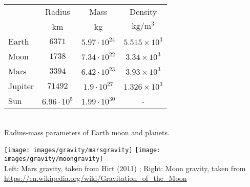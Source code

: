 \begin{center}
  \begin{tabular}{|l|c|c|c|} \hline
               & Radius & Mass & Density \\ 
               & km   & kg & $\mathrm{kg/m^3}$\\ \hline
     Earth   & $6371$ & $5.97 \cdot 10^{24}$ & $5.515 \times 10^3$ \\
     Moon    & $1738$ & $7.34 \cdot 10^{22}$ & $3.34  \times 10^3$ \\ 
     Mars    & $3394$ & $6.42 \cdot 10^{23}$ & $3.93  \times 10^3$ \\
     Jupiter &$71492$ & $1.9  \cdot 10^{27}$ & $1.326 \times 10^3$ \\
     Sun     &$6.96\cdot 10^5$ 
                      & $1.99 \cdot 10^{30}$ &        -            \\
  \hline
  \end{tabular} \\
{ \captionfont Radius-mass parameters of Earth moon and planets.}
\end{center}


\begin{center}
\texttt{[image: images/gravity/marsgravity]}
\texttt{[image: images/gravity/moongravity]}\\
{\captionfont Left: Mars gravity, taken from Hirt \etal (2011) \cite{hick12}; 
Right: Moon gravity, taken from \url{https://en.wikipedia.org/wiki/Gravitation_of_the_Moon}}
\end{center}





\vspace{0.5cm}


